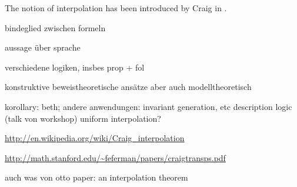 
The notion of interpolation has been introduced by Craig in \cite{Craig57linear}.

bindeglied zwischen formeln

aussage über sprache

verschiedene logiken, insbes prop + fol

konstruktive beweistheoretische ansätze aber auch modelltheoretisch

korollary: beth; andere anwendungen: invariant generation, etc
description logic (talk von workshop)
	uniform interpolation?

\url{http://en.wikipedia.org/wiki/Craig_interpolation}

\url{http://math.stanford.edu/~feferman/papers/craigtransps.pdf}

auch was von otto paper: an interpolation theorem
